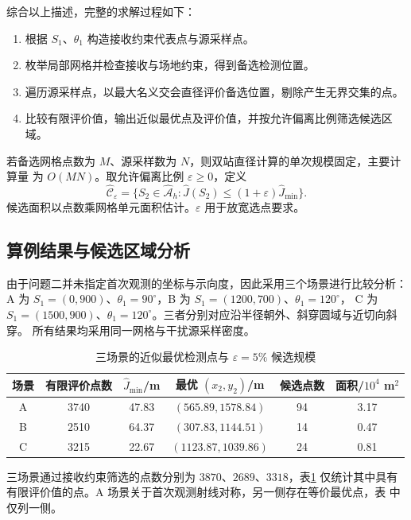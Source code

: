 \documentclass[withoutpreface,bwprint]{cumcmthesis} %
\begin{document}
综合以上描述，完整的求解过程如下：

\begin{enumerate}[label=\arabic*)]
\item 根据 $S_1$、$\theta_1$ 构造接收约束代表点与源采样点。
\item 枚举局部网格并检查接收与场地约束，得到备选检测位置。
\item 遍历源采样点，以最大名义交会直径评价备选位置，剔除产生无界交集的点。
\item 比较有限评价值，输出近似最优点及评价值，并按允许偏离比例筛选候选区域。
\end{enumerate}

若备选网格点数为 $M$、源采样数为 $N$，则双站直径计算的单次规模固定，主要计算量
为 $O(MN)$。取允许偏离比例 $\varepsilon\ge0$，定义
\begin{equation}\label{eq:p2-candidate}
\widehat{\mathcal C}_{\varepsilon}
=\{S_2\in\widehat{\mathcal A}_h:\widehat J(S_2)\le(1+\varepsilon)\widehat J_{\min}\}.
\end{equation}
候选面积以点数乘网格单元面积估计。$\varepsilon$ 用于放宽选点要求。

\subsection{算例结果与候选区域分析}

由于问题二并未指定首次观测的坐标与示向度，因此采用三个场景进行比较分析：A 
为 $S_1=(0,900)$、$\theta_1=90^\circ$，B 为 $S_1=(1200,700)$、$\theta_1=120^\circ$，
C 为 $S_1=(1500,900)$、$\theta_1=120^\circ$。三者分别对应沿半径朝外、斜穿圆域与近切向斜穿。
所有结果均采用同一网格与干扰源采样密度。

\begin{table}[H]
\centering\small
\caption{三场景的近似最优检测点与 $\varepsilon=5\%$ 候选规模}\label{tab:p2-best}
\begin{tabular}{cccccc}
\toprule
场景 & 有限评价点数 & $\widehat J_{\min}$/m & 最优 $(x_2,y_2)$/m & 候选点数 & 面积/$10^4$ m$^2$\\
\midrule
A & 3740 & 47.83 & $(565.89,1578.84)$ & 94 & 3.17\\
B & 2510 & 64.37 & $(307.83,1144.51)$ & 14 & 0.47\\
C & 3215 & 22.67 & $(1123.87,1039.86)$ & 24 & 0.81\\
\bottomrule
\end{tabular}
\end{table}

三场景通过接收约束筛选的点数分别为 $3870$、$2689$、$3318$，表\ref{tab:p2-best}
仅统计其中具有有限评价值的点。A 场景关于首次观测射线对称，另一侧存在等价最优点，表
中仅列一侧。
\end{document}
